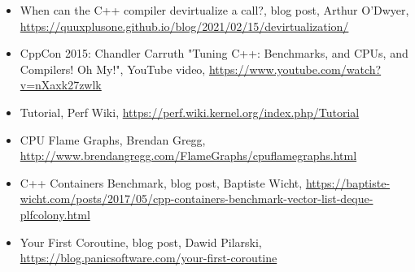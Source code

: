 

\begin{itemize}
\item 
When can the C++ compiler devirtualize a call?, blog post, Arthur O'Dwyer, \url{https://quuxplusone.github.io/blog/2021/02/15/devirtualization/}

\item 
CppCon 2015: Chandler Carruth "Tuning C++: Benchmarks, and CPUs, and Compilers! Oh My!", YouTube video, \url{https://www.youtube.com/watch?v=nXaxk27zwlk}

\item 
Tutorial, Perf Wiki, \url{https://perf.wiki.kernel.org/index.php/Tutorial}

\item 
CPU Flame Graphs, Brendan Gregg, \url{http://www.brendangregg.com/FlameGraphs/cpuflamegraphs.html}

\item 
C++ Containers Benchmark, blog post, Baptiste Wicht, \url{https://baptiste-wicht.com/posts/2017/05/cpp-containers-benchmark-vector-list-deque-plfcolony.html}

\item 
Your First Coroutine, blog post, Dawid Pilarski, \url{https://blog.panicsoftware.com/your-first-coroutine}
\end{itemize}